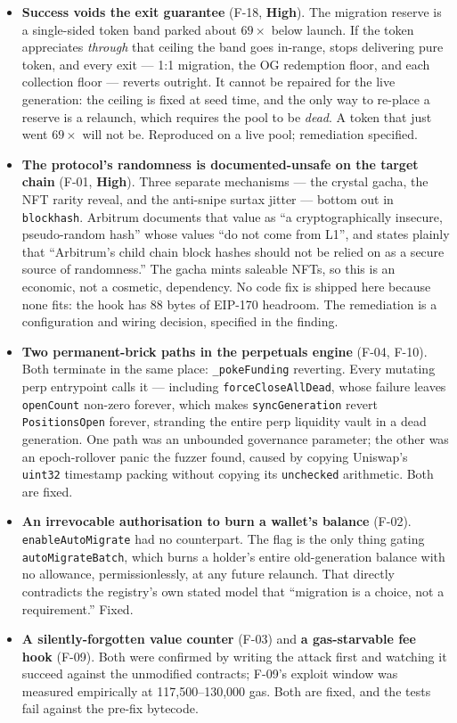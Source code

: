 \documentclass[11pt,a4paper]{article}
\newcommand{\SevHigh}{\textcolor{high}{\textbf{High}}}
\newcommand{\code}[1]{\texttt{\small #1}}
\begin{document}
\begin{itemize}
\item \textbf{Success voids the exit guarantee} (F-18, \SevHigh). The migration
reserve is a single-sided token band parked about $69\times$ below launch. If the
token appreciates \emph{through} that ceiling the band goes in-range, stops
delivering pure token, and every exit --- 1:1 migration, the OG redemption floor,
and each collection floor --- reverts outright. It cannot be repaired for the live
generation: the ceiling is fixed at seed time, and the only way to re-place a
reserve is a relaunch, which requires the pool to be \emph{dead}. A token that just
went $69\times$ will not be. Reproduced on a live pool; remediation specified.

\item \textbf{The protocol's randomness is documented-unsafe on the target
chain} (F-01, \SevHigh). Three separate mechanisms --- the crystal gacha, the NFT
rarity reveal, and the anti-snipe surtax jitter --- bottom out in
\code{blockhash}. Arbitrum documents that value as ``a cryptographically
insecure, pseudo-random hash'' whose values ``do not come from L1'', and states
plainly that ``Arbitrum's child chain block hashes should not be relied on as a
secure source of randomness.'' The gacha mints saleable NFTs, so this is an
economic, not a cosmetic, dependency. No code fix is shipped here because none
fits: the hook has 88 bytes of EIP-170 headroom. The remediation is a
configuration and wiring decision, specified in the finding.

\item \textbf{Two permanent-brick paths in the perpetuals engine} (F-04, F-10).
Both terminate in the same place: \code{\_pokeFunding} reverting. Every mutating
perp entrypoint calls it --- including \code{forceCloseAllDead}, whose failure
leaves \code{openCount} non-zero forever, which makes \code{syncGeneration}
revert \code{PositionsOpen} forever, stranding the entire perp liquidity vault in
a dead generation. One path was an unbounded governance parameter; the other was
an epoch-rollover panic the fuzzer found, caused by copying Uniswap's
\code{uint32} timestamp packing without copying its \code{unchecked} arithmetic.
Both are fixed.

\item \textbf{An irrevocable authorisation to burn a wallet's balance} (F-02).
\code{enableAutoMigrate} had no counterpart. The flag is the only thing gating
\code{autoMigrateBatch}, which burns a holder's entire old-generation balance
with no allowance, permissionlessly, at any future relaunch. That directly
contradicts the registry's own stated model that ``migration is a choice, not a
requirement.'' Fixed.

\item \textbf{A silently-forgotten value counter} (F-03) and \textbf{a
gas-starvable fee hook} (F-09). Both were confirmed by writing the attack first
and watching it succeed against the unmodified contracts; F-09's exploit window
was measured empirically at 117{,}500--130{,}000 gas. Both are fixed, and the
tests fail against the pre-fix bytecode.
\end{itemize}
\end{document}
